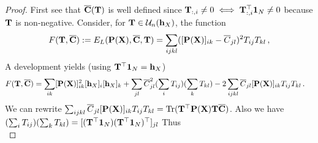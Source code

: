 \begin{proof}
	First see that $\overline{{\mathbf{C}}}({\mathbf{T}})$ is well defined since ${\mathbf{T}}_{:,i} \neq 0 \iff {\mathbf{T}}_{:,i}^\top \bm{1}_N \neq 0$ because ${\mathbf{T}}$ is non-negative. Consider, for ${\mathbf{T}} \in {\mathcal{U}}_n({\mathbf{h}}_X)$, the function
	\begin{equation}
		F({\mathbf{T}}, \overline{{\mathbf{C}}}):= E_{L}({\mathbf{P}}({\mathbf{X}}), \overline{{\mathbf{C}}}, {\mathbf{T}}) = \sum_{ijkl} ([{\mathbf{P}}({\mathbf{X}})]_{ik} - \overline{C}_{jl})^2 T_{ij} T_{kl}\,,
	\end{equation}
	A development yields (using ${\mathbf{T}}^\top \bm{1}_N = {\mathbf{h}}_X$)
	\begin{equation}
		\begin{split}
			F({\mathbf{T}}, \overline{{\mathbf{C}}}) &= \sum_{ik} [{\mathbf{P}}({\mathbf{X}})]^2_{ik} [{\mathbf{h}}_X]_i [{\mathbf{h}}_X]_k + \sum_{jl} \overline{C}^2_{jl}(\sum_{i}T_{ij}) (\sum_{k}T_{kl}) - 2\sum_{ijkl} \overline{C}_{jl}[{\mathbf{P}}({\mathbf{X}})]_{ik} T_{ij} T_{kl}\,.
		\end{split}
	\end{equation}
	We can rewrite $\sum_{ijkl} \overline{C}_{jl}[{\mathbf{P}}({\mathbf{X}})]_{ik} T_{ij} T_{kl} = \operatorname{Tr}({\mathbf{T}}^\top {\mathbf{P}}({\mathbf{X}}) {\mathbf{T}} \overline{{\mathbf{C}}})$. Also we have
	$(\sum_{i}T_{ij}) (\sum_{k}T_{kl})  = [({\mathbf{T}}^\top \bm{1}_N) ({\mathbf{T}}^\top \bm{1}_N)^\top]_{jl}$
	Thus 
	\begin{equation}

\end{equation}
\end{proof}

